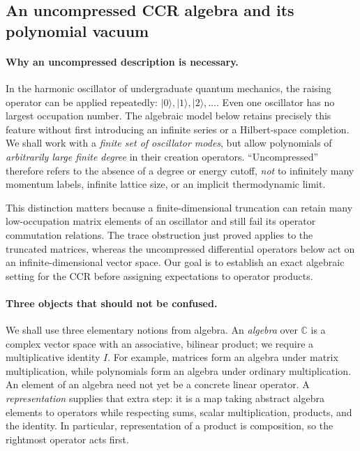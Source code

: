 \subsection{An uncompressed CCR algebra and its polynomial vacuum}

\paragraph{Why an uncompressed description is necessary.}
In the harmonic oscillator of undergraduate quantum mechanics, the raising
operator can be applied repeatedly:
$|0\rangle,|1\rangle,|2\rangle,\ldots$.  Even one oscillator has no
largest occupation number.  The algebraic model below retains precisely this
feature without first introducing an infinite series or a Hilbert-space
completion.  We shall work with a \emph{finite set of oscillator modes}, but
allow polynomials of \emph{arbitrarily large finite degree} in their creation
operators.  ``Uncompressed'' therefore refers to the absence of a degree or
energy cutoff, \emph{not} to infinitely many momentum labels, infinite
lattice size, or an implicit thermodynamic limit.

This distinction matters because a finite-dimensional truncation can retain
many low-occupation matrix elements of an oscillator and still fail its
operator commutation relations.  The trace obstruction just proved applies
to the truncated matrices, whereas the uncompressed differential operators
below act on an infinite-dimensional vector space.  Our goal is to establish
an exact algebraic setting for the CCR before assigning expectations to
operator products.

\paragraph{Three objects that should not be confused.}
We shall use three elementary notions from algebra.  An \emph{algebra} over
$\mathbb C$ is a complex vector space with an associative, bilinear product;
we require a multiplicative identity $I$.  For example, matrices form an
algebra under matrix multiplication, while polynomials form an algebra under
ordinary multiplication.  An element of an algebra need not yet be a
concrete linear operator.  A \emph{representation} supplies that extra step:
it is a map taking abstract algebra elements to operators while respecting
sums, scalar multiplication, products, and the identity.  In particular,
representation of a product is composition, so the rightmost operator acts
first.

